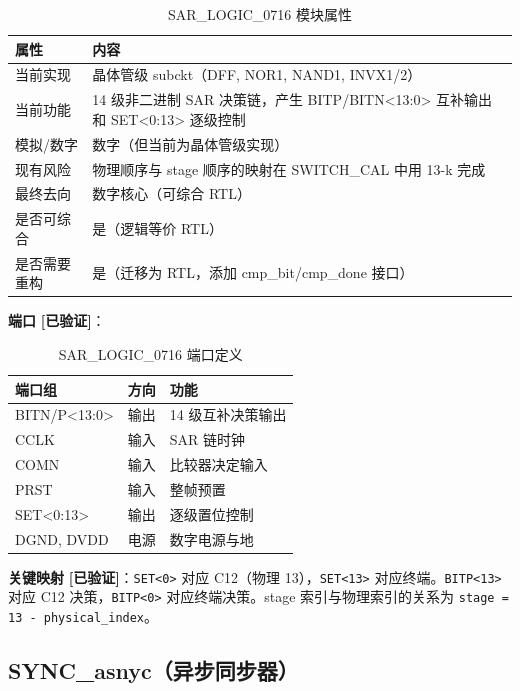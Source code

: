 \documentclass[UTF8,a4paper,11pt]{ctexart}
\newcommand{\verified}{\textcolor{verifiedgreen}{\textbf{[已验证]}}}
\begin{document}
\begin{table}[H]
\centering
\caption{SAR\_LOGIC\_0716 模块属性}
\label{tab:sar-attr}
\begin{tabular}{ll}
\toprule
属性 & 内容 \\
\midrule
当前实现   & 晶体管级 subckt（DFF, NOR1, NAND1, INVX1/2） \\
当前功能   & 14 级非二进制 SAR 决策链，产生 BITP/BITN<13:0> 互补输出和 SET<0:13> 逐级控制 \\
模拟/数字  & 数字（但当前为晶体管级实现） \\
现有风险   & 物理顺序与 stage 顺序的映射在 SWITCH\_CAL 中用 13-k 完成 \\
最终去向   & 数字核心（可综合 RTL） \\
是否可综合 & 是（逻辑等价 RTL） \\
是否需要重构 & 是（迁移为 RTL，添加 cmp\_bit/cmp\_done 接口） \\
\bottomrule
\end{tabular}
\end{table}

\textbf{端口} \verified：

\begin{table}[H]
\centering
\caption{SAR\_LOGIC\_0716 端口定义}
\label{tab:sar-ports}
\begin{tabular}{lll}
\toprule
端口组 & 方向 & 功能 \\
\midrule
BITN/P<13:0> & 输出 & 14 级互补决策输出 \\
CCLK         & 输入 & SAR 链时钟 \\
COMN         & 输入 & 比较器决定输入 \\
PRST         & 输入 & 整帧预置 \\
SET<0:13>    & 输出 & 逐级置位控制 \\
DGND, DVDD   & 电源 & 数字电源与地 \\
\bottomrule
\end{tabular}
\end{table}

\textbf{关键映射} \verified：\texttt{SET<0>} 对应 C12（物理 13），\texttt{SET<13>} 对应终端。\texttt{BITP<13>} 对应 C12 决策，\texttt{BITP<0>} 对应终端决策。stage 索引与物理索引的关系为 \texttt{stage = 13 - physical\_index}。

\subsection{SYNC\_asnyc（异步同步器）}
\end{document}
